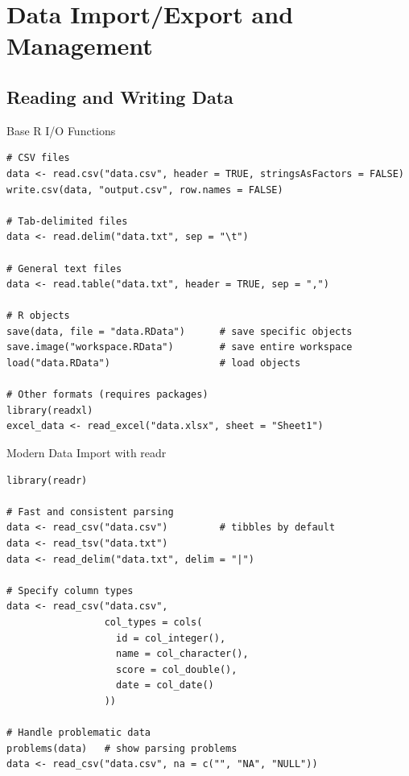 \documentclass[aspectratio=169]{beamer}
\begin{document}
\section{Data Import/Export and Management}

\subsection{Reading and Writing Data}

\begin{frame}[fragile]{Base R I/O Functions}
\begin{lstlisting}
# CSV files
data <- read.csv("data.csv", header = TRUE, stringsAsFactors = FALSE)
write.csv(data, "output.csv", row.names = FALSE)

# Tab-delimited files
data <- read.delim("data.txt", sep = "\t")

# General text files
data <- read.table("data.txt", header = TRUE, sep = ",")

# R objects
save(data, file = "data.RData")      # save specific objects
save.image("workspace.RData")        # save entire workspace
load("data.RData")                   # load objects

# Other formats (requires packages)
library(readxl)
excel_data <- read_excel("data.xlsx", sheet = "Sheet1")
\end{lstlisting}
\end{frame}

\begin{frame}[fragile]{Modern Data Import with readr}
\begin{lstlisting}
library(readr)

# Fast and consistent parsing
data <- read_csv("data.csv")         # tibbles by default
data <- read_tsv("data.txt")
data <- read_delim("data.txt", delim = "|")

# Specify column types
data <- read_csv("data.csv",
                 col_types = cols(
                   id = col_integer(),
                   name = col_character(),
                   score = col_double(),
                   date = col_date()
                 ))

# Handle problematic data
problems(data)   # show parsing problems
data <- read_csv("data.csv", na = c("", "NA", "NULL"))
\end{lstlisting}
\end{frame}
\end{document}
